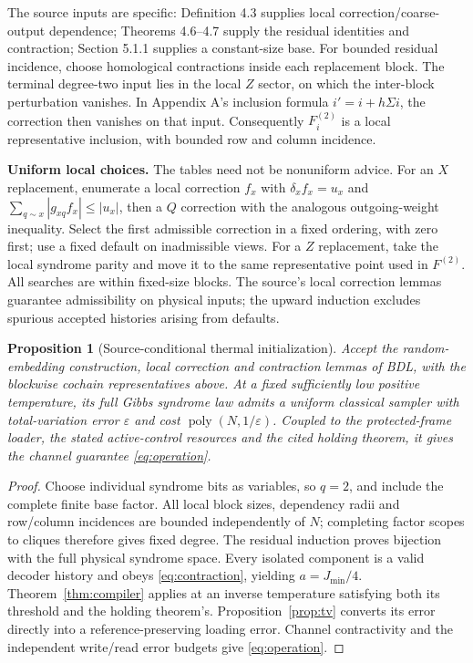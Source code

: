 \documentclass[11pt,a4paper]{article}
\newtheorem{proposition}{Proposition}
\newcommand{\poly}{\operatorname{poly}}
\begin{document}
The source inputs are specific: Definition 4.3 supplies local correction/coarse-output dependence; Theorems 4.6--4.7 supply the residual identities and contraction; Section 5.1.1 supplies a constant-size base. For bounded residual incidence, choose homological contractions inside each replacement block. The terminal degree-two input lies in the local $Z$ sector, on which the inter-block perturbation vanishes. In Appendix A's inclusion formula $i'=i+h\Sigma i$, the correction then vanishes on that input. Consequently $F_i^{(2)}$ is a local representative inclusion, with bounded row and column incidence.\cite{bdl}

\textbf{Uniform local choices.} The tables need not be nonuniform advice. For an $X$ replacement, enumerate a local correction $f_x$ with $\delta_x f_x=u_x$ and $\sum_{q\sim x}|g_{xq}f_x|\leq|u_x|$, then a $Q$ correction with the analogous outgoing-weight inequality. Select the first admissible correction in a fixed ordering, with zero first; use a fixed default on inadmissible views. For a $Z$ replacement, take the local syndrome parity and move it to the same representative point used in $F^{(2)}$. All searches are within fixed-size blocks. The source's local correction lemmas guarantee admissibility on physical inputs; the upward induction excludes spurious accepted histories arising from defaults.

\begin{proposition}[Source-conditional thermal initialization]\label{prop:bdl}
Accept the random-embedding construction, local correction and contraction lemmas of BDL, with the blockwise cochain representatives above. At a fixed sufficiently low positive temperature, its full Gibbs syndrome law admits a uniform classical sampler with total-variation error $\varepsilon$ and cost $\poly(N,1/\varepsilon)$. Coupled to the protected-frame loader, the stated active-control resources and the cited holding theorem, it gives the channel guarantee \eqref{eq:operation}.
\end{proposition}
\begin{proof}
Choose individual syndrome bits as variables, so $q=2$, and include the complete finite base factor. All local block sizes, dependency radii and row/column incidences are bounded independently of $N$; completing factor scopes to cliques therefore gives fixed degree. The residual induction proves bijection with the full physical syndrome space. Every isolated component is a valid decoder history and obeys \eqref{eq:contraction}, yielding $a=J_{\min}/4$. Theorem~\ref{thm:compiler} applies at an inverse temperature satisfying both its threshold and the holding theorem's. Proposition~\ref{prop:tv} converts its error directly into a reference-preserving loading error. Channel contractivity and the independent write/read error budgets give \eqref{eq:operation}.
\end{proof}
\end{document}
